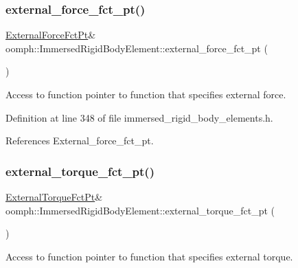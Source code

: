 \subsubsection{\texorpdfstring{external\+\_\+force\+\_\+fct\+\_\+pt()}{external\_force\_fct\_pt()}}
{\footnotesize\ttfamily \hyperlink{classoomph_1_1ImmersedRigidBodyElement_a7a43bfd54213becfb135b594720b0539}{External\+Force\+Fct\+Pt}\& oomph\+::\+Immersed\+Rigid\+Body\+Element\+::external\+\_\+force\+\_\+fct\+\_\+pt (\begin{DoxyParamCaption}{ }\end{DoxyParamCaption})\hspace{0.3cm}{\ttfamily [inline]}}



Access to function pointer to function that specifies external force. 



Definition at line 348 of file immersed\+\_\+rigid\+\_\+body\+\_\+elements.\+h.



References External\+\_\+force\+\_\+fct\+\_\+pt.

\mbox{\label{classoomph_1_1ImmersedRigidBodyElement_a06c876a8a96c2d4e168aa6cdc48b1f15}} 
\subsubsection{\texorpdfstring{external\+\_\+torque\+\_\+fct\+\_\+pt()}{external\_torque\_fct\_pt()}}
{\footnotesize\ttfamily \hyperlink{classoomph_1_1ImmersedRigidBodyElement_a455638a1d0e9547290d835513d00c40e}{External\+Torque\+Fct\+Pt}\& oomph\+::\+Immersed\+Rigid\+Body\+Element\+::external\+\_\+torque\+\_\+fct\+\_\+pt (\begin{DoxyParamCaption}{ }\end{DoxyParamCaption})\hspace{0.3cm}{\ttfamily [inline]}}



Access to function pointer to function that specifies external torque. 



